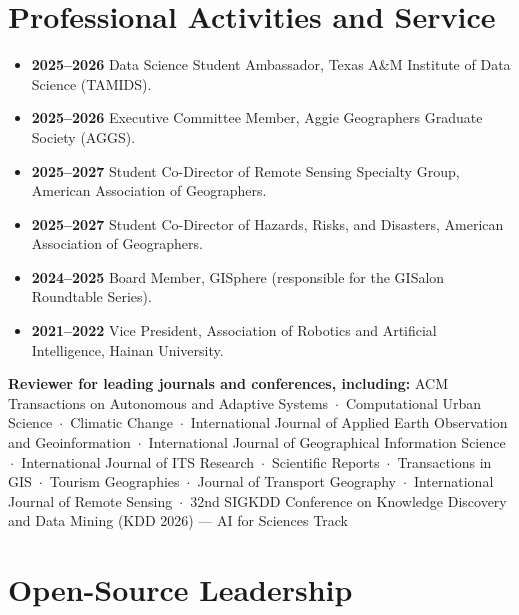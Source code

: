 \documentclass[10pt,letterpaper]{article}
\newenvironment{plainlist}
  {\begin{itemize}[leftmargin=1.1em,itemsep=0.10em,topsep=0.20em,parsep=0pt,label={}]}
  {\end{itemize}}
\newcommand{\dt}[1]{\textbf{#1}\hspace{0.6em}}
\begin{document}
\section{Professional Activities and Service}

\begin{plainlist}
  \item \dt{2025--2026} Data Science Student Ambassador, Texas A\&M Institute of Data Science (TAMIDS).
  \item \dt{2025--2026} Executive Committee Member, Aggie Geographers Graduate Society (AGGS).
  \item \dt{2025--2027} Student Co-Director of Remote Sensing Specialty Group, American Association of Geographers.
  \item \dt{2025--2027} Student Co-Director of Hazards, Risks, and Disasters, American Association of Geographers.
  \item \dt{2024--2025} Board Member, GISphere (responsible for the GISalon Roundtable Series).
  \item \dt{2021--2022} Vice President, Association of Robotics and Artificial Intelligence, Hainan University.
\end{plainlist}

\vspace{0.4em}
\textbf{Reviewer for leading journals and conferences, including:}
ACM Transactions on Autonomous and Adaptive Systems \,$\cdot$\, Computational Urban Science \,$\cdot$\, Climatic Change \,$\cdot$\, International Journal of Applied Earth Observation and Geoinformation \,$\cdot$\, International Journal of Geographical Information Science \,$\cdot$\, International Journal of ITS Research \,$\cdot$\, Scientific Reports \,$\cdot$\, Transactions in GIS \,$\cdot$\, Tourism Geographies \,$\cdot$\, Journal of Transport Geography \,$\cdot$\, International Journal of Remote Sensing \,$\cdot$\, 32nd SIGKDD Conference on Knowledge Discovery and Data Mining (KDD 2026) --- AI for Sciences Track

\section{Open-Source Leadership}
\end{document}
